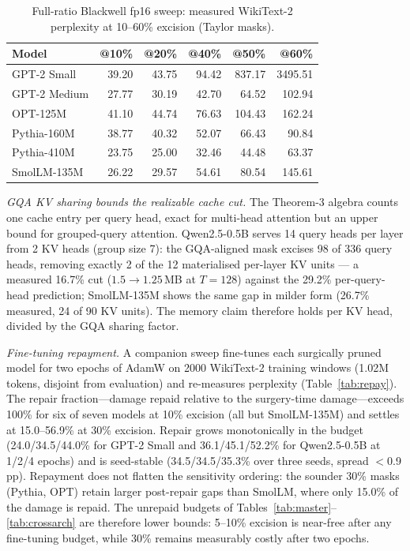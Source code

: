 \documentclass[11pt]{article}
\begin{document}
\begin{table}[!t]
\caption{Full-ratio Blackwell fp16 sweep: measured WikiText-2 perplexity at
10--60\% excision (Taylor masks).}
\label{tab:fullratio}
\centering
\scriptsize
\setlength{\tabcolsep}{4pt}
\begin{tabular}{lrrrrr}
\toprule
Model & @10\% & @20\% & @40\% & @50\% & @60\% \\
\midrule
GPT-2 Small & 39.20 & 43.75 & 94.42 & 837.17 & 3495.51 \\
GPT-2 Medium & 27.77 & 30.19 & 42.70 & 64.52 & 102.94 \\
OPT-125M & 41.10 & 44.74 & 76.63 & 104.43 & 162.24 \\
Pythia-160M & 38.77 & 40.32 & 52.07 & 66.43 & 90.84 \\
Pythia-410M & 23.75 & 25.00 & 32.46 & 44.48 & 63.37 \\
SmolLM-135M & 26.22 & 29.57 & 54.61 & 80.54 & 145.61 \\
\bottomrule
\end{tabular}
\end{table}

\emph{GQA KV sharing bounds the realizable cache cut.} The Theorem-3 algebra
counts one cache entry per query head, exact for multi-head attention but an
upper bound for grouped-query attention. Qwen2.5-0.5B serves 14 query heads
per layer from 2 KV heads (group size 7): the GQA-aligned mask excises 98 of
336 query heads, removing exactly 2 of the 12 materialised per-layer KV
units --- a measured 16.7\% cut ($1.5{\to}1.25$\,MB at $T{=}128$) against the
29.2\% per-query-head prediction; SmolLM-135M
shows the same gap in milder form (26.7\% measured, 24 of 90 KV units). The
memory claim therefore holds per KV head, divided by the GQA sharing factor.

\emph{Fine-tuning repayment.} A companion sweep fine-tunes each surgically
pruned model for two epochs of AdamW on 2000 WikiText-2 training windows
(1.02M tokens, disjoint from evaluation) and re-measures perplexity
(Table~\ref{tab:repay}). The repair fraction---damage repaid relative to the
surgery-time damage---exceeds 100\% for six of seven models at 10\% excision
(all but SmolLM-135M) and settles at 15.0--56.9\% at 30\% excision. Repair
grows monotonically in the budget (24.0/34.5/44.0\% for GPT-2 Small and
36.1/45.1/52.2\% for Qwen2.5-0.5B at 1/2/4 epochs) and is seed-stable
(34.5/34.5/35.3\% over three seeds, spread $<$0.9 pp).
Repayment does not flatten the sensitivity ordering: the
sounder 30\% masks (Pythia, OPT) retain larger post-repair gaps than SmolLM,
where only 15.0\% of the damage is repaid. The unrepaid budgets of
Tables~\ref{tab:master}--\ref{tab:crossarch} are therefore lower bounds:
5--10\% excision is near-free after any fine-tuning budget, while 30\%
remains measurably costly after two epochs.
\end{document}
